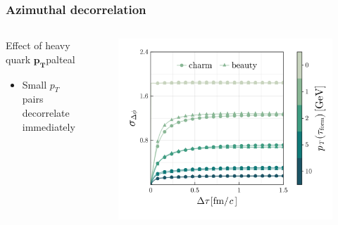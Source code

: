 \documentclass[aspectratio=169,11pt,usenames,dvipsnames]{beamer}
\begin{document}
\begin{frame}
    \frametitle{Azimuthal decorrelation}
    \vspace{-15pt}
    \begin{center}
        \begin{columns}[onlytextwidth,t]
           \begin{center}
                \begin{custombox2}{\normalsize Effect of heavy quark $\boldsymbol{p_T}$}{palteal}
                    \small
                    \begin{varwidth}{0.92\textwidth}
                    \begin{itemize}\itemsep0em 
                        \itemsep0em
                        \footnotesize
                        \item Small $p_T$ pairs decorrelate immediately 
                    \end{itemize}
                    \end{varwidth}
                \end{custombox2}
            \end{center}
            \vspace{-10pt}
           \begin{figure}
                \centering
                \includegraphics[width=0.95\columnwidth]{images/sigma_dphideta_tau_charm_beauty_pT_dep_final_azimuth.png}

\end{figure}
\end{columns}
\end{center}
\end{frame}
\end{document}
